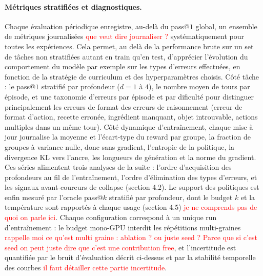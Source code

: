 \documentclass[11pt,a4paper]{article}
\begin{document}
\paragraph{Métriques stratifiées et diagnostiques.} Chaque évaluation périodique enregistre, au-delà du pass@$1$ global, un ensemble de métriques journalisées \textcolor{red}{que veut dire journaliser ? } systématiquement pour toutes les expériences. Cela permet, au delà de la performance brute sur un set de tâches non stratifiées autant en train qu'en test, d'apprécier l'évolution du comportement du modèle par exemple sur les types d'erreurs effectuées, en fonction de la stratégie de curriculum et des hyperparamètres choisis. Côté tâche : le pass@$1$ stratifié par profondeur ($d = 1$ à $4$), le nombre moyen de tours par épisode, et une taxonomie d'erreurs par épisode et par dificulté pour distinguer principalement les erreurs de format des erreurs de raisonnement (erreur de format d'action, recette erronée, ingrédient manquant, objet introuvable, actions multiples dans un même tour). Côté dynamique d'entraînement, chaque mise à jour journalise la moyenne et l'écart-type du reward par groupe, la fraction de groupes à variance nulle, donc sans gradient, l'entropie de la politique, la divergence KL vers l'ancre, les longueurs de génération et la norme du gradient. Ces séries alimentent trois analyses de la suite : l'ordre d'acquisition des profondeurs au fil de l'entraînement, l'ordre d'élimination des types d'erreurs, et les signaux avant-coureurs de collapse (section 4.2). Le support des politiques est enfin mesuré par l'oracle pass@$k$ stratifié par profondeur, dont le budget $k$ et la température sont rapportés à chaque usage (section 4.5) \textcolor{red}{je ne comprends pas de quoi on parle ici}. Chaque configuration correspond à un unique run d'entraînement : le budget mono-GPU interdit les répétitions multi-graines \textcolor{red}{rappelle moi ce qu'est multi graine : ablation ? ou juste seed ? Parce que si c'est seed on peut juste dire que c'est une contribution free}, et l'incertitude est quantifiée par le bruit d'évaluation décrit ci-dessus et par la stabilité temporelle des courbes \textcolor{red}{il faut détailler cette partie incertitude}.
\end{document}
